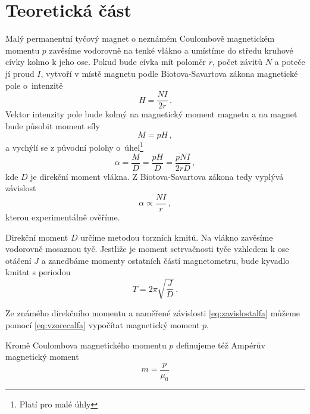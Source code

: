 \section*{Teoretická část}

Malý permanentní tyčový magnet o neznámém Coulombově magnetickém momentu $p$ zavěsíme vodorovně na tenké vlákno a umístíme do středu kruhové cívky kolmo k jeho ose.
Pokud bude cívka mít poloměr $r$, počet závitů $N$ a poteče jí proud $I$, vytvoří v místě magnetu podle Biotova-Savartova\cite{elektrika} zákona magnetické pole o~intenzitě
\begin{equation}
H=\frac{NI}{2r} \,.
\end{equation}
Vektor intenzity pole bude kolmý na magnetický moment magnetu a na magnet bude působit moment síly
\begin{equation}
M=pH \,,
\end{equation}
a vychýlí se z původní polohy o~úhel\footnote{Platí pro malé úhly}
\begin{equation} \label{eq:vzorecalfa}
\alpha = \frac{M}{D} = \frac{pH}{D} = \frac{pNI}{2rD} \,,
\end{equation}
kde $D$ je direkční moment vlákna.
Z Biotova-Savartova zákona tedy vyplývá závislost
\begin{equation} \label{eq:zavislostalfa}
\alpha \propto \frac{NI}{r} \,,
\end{equation}
kterou experimentálně ověříme.

Direkční moment $D$ určíme metodou torzních kmitů.
Na vlákno zavěsíme vodorovně mosaznou tyč.
Jestliže je moment setrvačnosti tyče vzhledem k ose otáčení $J$ a zanedbáme momenty ostatních částí magnetometru, bude kyvadlo kmitat s periodou 
\begin{equation} \label{eq:periodadirekcnimoment}
T=2\pi \sqrt{\frac{J}{D}} \,.
\end{equation}

Ze známého direkčního momentu a naměřené závislosti \eqref{eq:zavislostalfa} můžeme pomocí \eqref{eq:vzorecalfa} vypočítat magnetický moment $p$.

Kromě Coulombova magnetického momentu $p$ definujeme též Ampérův magnetický moment
\begin{equation} \label{eq:amper}
m=\frac{p}{\mu_0}
\end{equation}